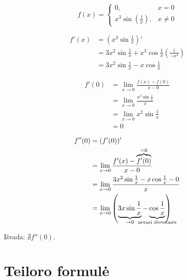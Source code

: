 \begin{exmp}
  \begin{equation*}
    f(x) = 
    \begin{cases}
      0, & x = 0 \\
      x^{3} \sin \left( \frac{1}{x} \right), & x \neq 0
    \end{cases}
  \end{equation*}

  \begin{align*}
    f'(x) 
    &= \left( x^{3} \sin \frac{1}{x} \right)' \\
    &= 3 x^{2} \sin \frac{1}{x} +   
      x^{3} \cos \frac{1}{x} \left( \frac{1}{-x^{2}} \right) \\
    &= 3 x^{2} \sin \frac{1}{x} - x \cos \frac{1}{x}
  \end{align*}

  \begin{align*}
    f'(0)
    &= \lim _{x \to 0} \frac{f(x) - f(0)}{x - 0} \\
    &= \lim _{x \to 0} \frac{x^{3} \sin \frac{1}{x}}{x} \\
    &= \lim _{x \to 0} x^{2} \sin \frac{1}{x} \\
    &= 0
  \end{align*}

  \begin{align*}
    f''(0)
    &= (f'(0))' \\
    &= \lim _{x \to 0} \frac{f'(x) - \overbrace{f'(0)}^{= 0}}{x - 0} \\
    &= \lim _{x \to 0} 
      \frac{3 x^{2} \sin \frac{1}{x} - x \cos \frac{1}{x} - 0}{x} \\
    &= \lim _{x \to 0} 
      \left( 
        \underbrace{3 x \sin \frac{1}{x}}_{\to 0} - 
        \underbrace{\cos \frac{1}{x}}_{\mathclap{\text{neturi išvestinės}}} 
      \right)
  \end{align*}

  Išvada: $\nexists f''(0)$.
\end{exmp}

\section{Teiloro formulė}

